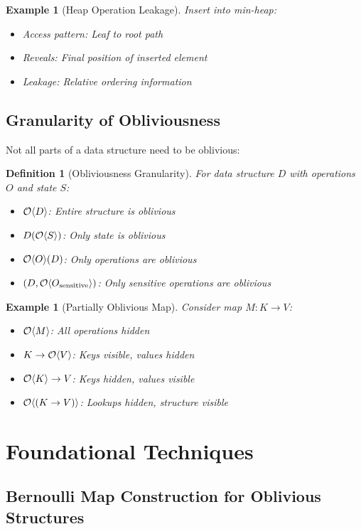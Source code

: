\documentclass[11pt,final,hidelinks]{article}
\newtheorem{definition}[theorem]{Definition}
\newtheorem{example}[theorem]{Example}
\begin{document}
\begin{example}[Heap Operation Leakage]
Insert into min-heap:
\begin{itemize}
    \item Access pattern: Leaf to root path
    \item Reveals: Final position of inserted element
    \item Leakage: Relative ordering information
\end{itemize}
\end{example}

\subsection{Granularity of Obliviousness}

Not all parts of a data structure need to be oblivious:

\begin{definition}[Obliviousness Granularity]
For data structure $D$ with operations $O$ and state $S$:
\begin{itemize}
    \item $\mathcal{O}\langle D \rangle$: Entire structure is oblivious
    \item $D(\mathcal{O}\langle S \rangle)$: Only state is oblivious
    \item $\mathcal{O}\langle O \rangle(D)$: Only operations are oblivious
    \item $(D, \mathcal{O}\langle O_{\text{sensitive}} \rangle)$: Only sensitive operations are oblivious
\end{itemize}
\end{definition}

\begin{example}[Partially Oblivious Map]
Consider map $M: K \to V$:
\begin{itemize}
    \item $\mathcal{O}\langle M \rangle$: All operations hidden
    \item $K \to \mathcal{O}\langle V \rangle$: Keys visible, values hidden
    \item $\mathcal{O}\langle K \rangle \to V$: Keys hidden, values visible
    \item $\mathcal{O}\langle (K \to V) \rangle$: Lookups hidden, structure visible
\end{itemize}
\end{example}

\section{Foundational Techniques}

\subsection{Bernoulli Map Construction for Oblivious Structures}
\end{document}
